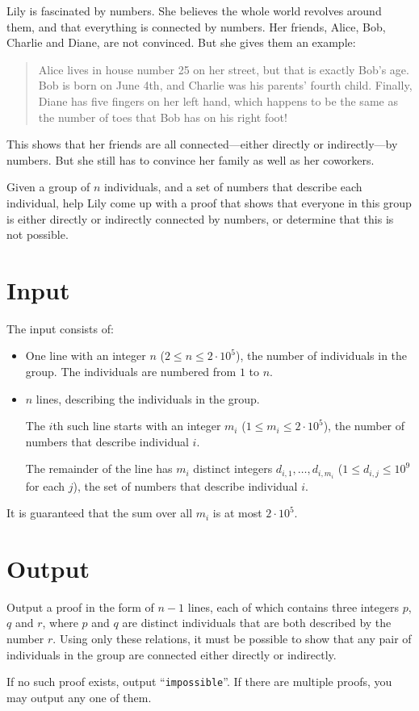 %
Lily is fascinated by numbers. She believes the whole world revolves around
them, and that everything is connected by numbers. Her friends, Alice, Bob,
Charlie and Diane, are not convinced. But she gives them an example:

\begin{quote}
    Alice lives in house number 25 on her street, but that is exactly Bob's age.
    Bob is born on June 4th, and Charlie was his parents' fourth child.
    Finally, Diane has five fingers on her left hand, which happens to be the same
    as the number of toes that Bob has on his right foot!
\end{quote}

This shows that her friends are all connected---either directly or
indirectly---by numbers. But she still has to convince her family as well as
her coworkers.

Given a group of $n$ individuals, and a set of numbers that describe
each individual, help Lily come up with a proof that shows that everyone in this
group is either directly or indirectly connected by numbers, or determine that
this is not possible.

\section*{Input}
The input consists of:
\begin{itemize}
    \item One line with an integer $n$ ($2 \leq n \leq 2\cdot 10^5$), the number of
    individuals in the group. The individuals are numbered from $1$ to $n$.
    \item $n$ lines, describing the individuals in the group.

    The $i$th such line starts with an integer $m_i$ ($1 \leq m_i \leq 2\cdot
    10^5$), the number of numbers that describe individual $i$.

    The remainder of the line has $m_i$ distinct integers
    $d_{i,1},\ldots,d_{i,m_i}$ ($1 \leq d_{i,j} \leq 10^9$ for each $j$), the
    set of numbers that describe individual $i$.
\end{itemize}

It is guaranteed that the sum over all $m_i$ is at most $2\cdot 10^5$.

\section*{Output}
Output a proof in the form of $n-1$ lines, each of which contains three
integers $p$, $q$ and $r$, where $p$ and $q$ are distinct individuals
that are both described by the number $r$. Using only these relations, it
must be possible to show that any pair of individuals in the group are
connected either directly or indirectly.

If no such proof exists, output ``\texttt{impossible}''. If there are
multiple proofs, you may output any one of them.

